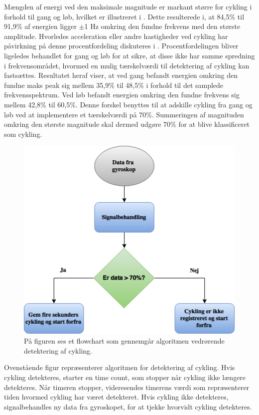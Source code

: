 Mængden af energi ved den maksimale magnitude er markant større for cykling i forhold til gang og løb, hvilket er illustreret i . Dette resulterede i, at 84,5\% til 91,9\% af energien ligger $\pm$1 Hz omkring den fundne frekvens med den største amplitude. Hvorledes acceleration eller andre hastigheder ved cykling har påvirkning på denne procentfordeling diskuteres i . Procentfordelingen bliver ligeledes behandlet for gang og løb for at sikre, at disse ikke har samme spredning i frekvensområdet, hvormed en mulig tærskelværdi til detektering af cykling kan fastsættes. Resultatet heraf viser, at ved gang befandt energien omkring den fundne maks peak sig mellem 35,9\% til 48,5\% i forhold til det samplede frekvensspektrum. Ved løb befandt energien omkring den fundne frekvens sig mellem 42,8\% til 60,5\%. Denne forskel benyttes til at adskille cykling fra gang og løb ved at implementere et tærskelværdi på 70\%. Summeringen af magnituden omkring den største magnitude skal dermed udgøre 70\% for at blive klassificeret som cykling. 
\begin{figure}[H]
	\centering
	\includegraphics[scale=0.6]{figures/cDesign/algoritme_cykling.png}
	\caption{På figuren ses et flowchart som gennemgår algoritmen vedrørende detektering af cykling.}
	\label{fig:algoritme_cykling}
\end{figure}
Ovenstående figur repræsenterer algoritmen for detektering af cykling. Hvis cykling detekteres, starter en time count, som stopper når cykling ikke længere detekteres. Når timeren stopper, videresendes timerens værdi som repræsenterer tiden hvormed cykling har været detekteret. Hvis cykling ikke detekteres, signalbehandles ny data fra gyroskopet, for at tjekke hvorvidt cykling detekteres.
